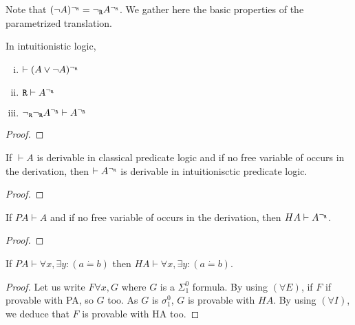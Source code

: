 Note that $(\neg A)^{\neg_{\texttt{R}}} = {\neg_{\texttt{R}}} A^{\neg_{\texttt{R}}}$. We gather here the basic properties of the parametrized translation.

\begin{proposition}
    In intuitionistic logic,
    \begin{enumerate}[(i)]
        \item $\vdash (A\vee \neg A)^{\neg_{\texttt{R}}}$
        \item $\texttt{R} \vdash A^{\neg_{\texttt{R}}}$
        \item ${\neg_{\texttt{R}}}{\neg_{\texttt{R}}} A^{\neg_{\texttt{R}}} \vdash A^{\neg_{\texttt{R}}}$
    \end{enumerate}
\end{proposition}
\begin{proof}
    
\end{proof}

\begin{theoreme}
    If $\vdash A$ is derivable in classical predicate logic and if no free variable of \R occurs in the derivation, then $\vdash A^{\neg_{\texttt{R}}}$ is derivable in intuitionisctic predicate logic.
\end{theoreme}
\begin{proof}

\end{proof}

\begin{theoreme}
    If $PA \vdash A$ and if no free variable of \R occurs in the derivation, then $HA \vdash A^{\neg_{\texttt{R}}}$.
\end{theoreme}
\begin{proof}
    
\end{proof}

\begin{theoreme}
    If $PA\vdash \forall x,\exists y:(a\dot{=}b)$ then $HA\vdash \forall x, \exists y: (a\dot{=}b)$.
\end{theoreme}
\begin{proof}
    Let us write $F \forall x,G$ where $G$ is a $\Sigma_1^0$ formula. By using $(\forall E)$, if $F$ if provable with PA, so $G$ too. As $G$ is $\sigma_1^0$, $G$ is provable with $HA$. By using $(\forall I)$, we deduce that $F$ is provable with HA too.
\end{proof}

